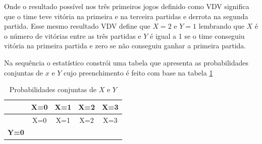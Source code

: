 \documentclass[
]{book}
\begin{document}
Onde o resultado possível nos três primeiros jogos definido como VDV significa que o time teve vitória na primeira e na terceira partidas e derrota na segunda partida. Esse mesmo resultado VDV define que \(X=2\) e \(Y=1\) lembrando que \(X\) é o número de vitórias entre as três partidas e \(Y\) é igual a 1 se o time conseguiu vitória na primeira partida e zero se não conseguiu ganhar a primeira partida.

Na sequência o estatístico constrói uma tabela que apresenta as probabilidades conjuntas de \(x\) e \(Y\) cujo preenchimento é feito com base na tabela \ref{tab:ProbabilidadesConjuntasDeXeY}

\begin{longtable}[]{@{}lcccc@{}}
\caption{\label{tab:ProbabilidadesConjuntasDeXeY} Probabilidades conjuntas de \(X\) e \(Y\)}\tabularnewline
\toprule
\begin{minipage}[b]{0.12\columnwidth}\raggedright
\strut
\end{minipage} & \begin{minipage}[b]{0.13\columnwidth}\centering
X=0\strut
\end{minipage} & \begin{minipage}[b]{0.13\columnwidth}\centering
X=1\strut
\end{minipage} & \begin{minipage}[b]{0.13\columnwidth}\centering
X=2\strut
\end{minipage} & \begin{minipage}[b]{0.13\columnwidth}\centering
X=3\strut
\end{minipage}\tabularnewline
\midrule
\endfirsthead
\toprule
\begin{minipage}[b]{0.12\columnwidth}\raggedright
\strut
\end{minipage} & \begin{minipage}[b]{0.13\columnwidth}\centering
X=0\strut
\end{minipage} & \begin{minipage}[b]{0.13\columnwidth}\centering
X=1\strut
\end{minipage} & \begin{minipage}[b]{0.13\columnwidth}\centering
X=2\strut
\end{minipage} & \begin{minipage}[b]{0.13\columnwidth}\centering
X=3\strut
\end{minipage}\tabularnewline
\midrule
\endhead
\begin{minipage}[t]{0.12\columnwidth}\raggedright
\textbf{Y=0}\strut

\end{minipage}
\end{longtable}
\end{document}
